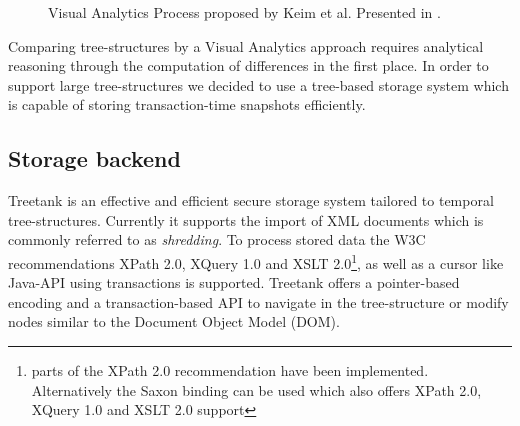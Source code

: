 \begin{figure}[htb]
\caption{\label{fig:visualanalyticsprocess} Visual Analytics Process proposed by Keim et al. Presented in \cite{keim2008visual}.}
\end{figure}


Comparing tree-structures by a Visual Analytics approach requires analytical reasoning through the computation of differences in the first place. In order to support large tree-structures we decided to use a tree-based storage system which is capable of storing transaction-time snapshots efficiently.

\subsection{Storage backend}
Treetank\cite{TREETANK} is an effective and efficient secure storage system tailored to temporal tree-structures. Currently it supports the import of XML documents which is commonly referred to as \emph{shredding}. To process stored data the W3C recommendations XPath 2.0, XQuery 1.0 and XSLT 2.0\footnote{parts of the XPath 2.0 recommendation have been implemented. Alternatively the Saxon binding can be used which also offers XPath 2.0, XQuery 1.0 and XSLT 2.0 support}, as well as a cursor like Java-API using transactions is supported. Treetank offers a pointer-based encoding and a transaction-based API to navigate in the tree-structure or modify nodes similar to the Document Object Model (DOM\cite{DOM}).

